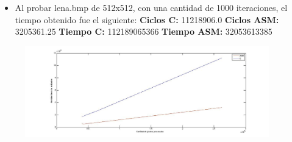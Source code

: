 \documentclass[10pt, a4paper]{article}
\begin{document}
\begin{itemize}
\begin{itemize}
\item{Al probar lena.bmp de 512x512, con una cantidad de 1000 iteraciones, el tiempo obtenido fue el siguiente:\newline
\newline
\textbf{Ciclos C:}                 11218906.0\newline
\vspace{0.15cm}
\textbf{Ciclos ASM:}               3205361.25\newline
\textbf{Tiempo C:}                 112189065366\newline
\textbf{Tiempo ASM:}               32053613385\newline}
\end{itemize}
\end{itemize}

\begin{figure}[H] %
\begin{center}
\includegraphics[width=300pt]{./ciclosRotar.jpg}
\end{center}
\end{figure}
\end{document}
